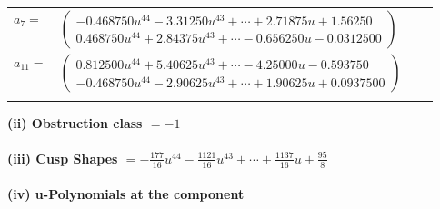 \documentclass[1p]{elsarticle_modified}
\theoremstyle{definition}
\begin{document}
\begin{tabular}{m{7pt} m{180pt} m{7pt} m{180pt} }
\flushright $a_{7}=$&$\begin{pmatrix}-0.468750 u^{44}-3.31250 u^{43}+\cdots+2.71875 u+1.56250\\0.468750 u^{44}+2.84375 u^{43}+\cdots-0.656250 u-0.0312500\end{pmatrix}$ \\
\flushright $a_{11}=$&$\begin{pmatrix}0.812500 u^{44}+5.40625 u^{43}+\cdots-4.25000 u-0.593750\\-0.468750 u^{44}-2.90625 u^{43}+\cdots+1.90625 u+0.0937500\end{pmatrix}$\\&\end{tabular}
\flushleft \textbf{(ii) Obstruction class $= -1$}\\~\\
\flushleft \textbf{(iii) Cusp Shapes $= -\frac{177}{16} u^{44}-\frac{1121}{16} u^{43}+\cdots+\frac{1137}{16} u+\frac{95}{8}$}\\~\\
\newpage\renewcommand{\arraystretch}{1}
\flushleft \textbf{(iv) u-Polynomials at the component}\newline \\
\end{document}
